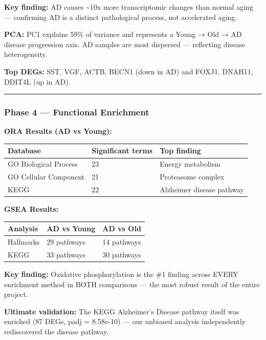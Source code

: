 \documentclass[
]{article}
\begin{document}
\textbf{Key finding:} AD causes \textasciitilde10x more transcriptomic
changes than normal aging --- confirming AD is a distinct pathological
process, not accelerated aging.

\textbf{PCA:} PC1 explains 59\% of variance and represents a Young → Old
→ AD disease progression axis. AD samples are most dispersed ---
reflecting disease heterogeneity.

\textbf{Top DEGs:} SST, VGF, ACTB, BECN1 (down in AD) and FOXJ1, DNAH11,
DDIT4L (up in AD).

\begin{center}\rule{0.5\linewidth}{0.5pt}\end{center}

\subsubsection{Phase 4 --- Functional
Enrichment}\label{phase-4-functional-enrichment}

\textbf{ORA Results (AD vs Young):}

\begin{longtable}[]{@{}lll@{}}
\toprule\noalign{}
Database & Significant terms & Top finding \\
\midrule\noalign{}
\endhead
\bottomrule\noalign{}
\endlastfoot
GO Biological Process & 23 & Energy metabolism \\
GO Cellular Component & 21 & Proteasome complex \\
KEGG & 22 & Alzheimer disease pathway \\
\end{longtable}

\textbf{GSEA Results:}

\begin{longtable}[]{@{}lll@{}}
\toprule\noalign{}
Analysis & AD vs Young & AD vs Old \\
\midrule\noalign{}
\endhead
\bottomrule\noalign{}
\endlastfoot
Hallmarks & 29 pathways & 14 pathways \\
KEGG & 33 pathways & 30 pathways \\
\end{longtable}

\textbf{Key finding:} Oxidative phosphorylation is the \#1 finding
across EVERY enrichment method in BOTH comparisons --- the most robust
result of the entire project.

\textbf{Ultimate validation:} The KEGG Alzheimer's Disease pathway
itself was enriched (87 DEGs, padj = 8.58e-10) --- our unbiased analysis
independently rediscovered the disease pathway.
\end{document}
